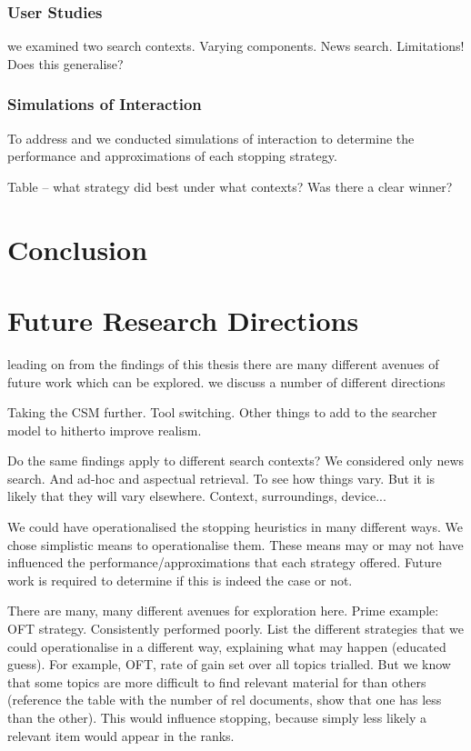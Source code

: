 \subsubsection{User Studies}
we examined two search contexts. Varying components. News search. Limitations! Does this generalise?

\subsubsection{Simulations of Interaction}
To address  and  we conducted simulations of interaction to determine the performance and approximations of each stopping strategy. 

Table -- what strategy did best under what contexts?
Was there a clear winner?




\section{Conclusion}

\section{Future Research Directions}
leading on from the findings of this thesis there are many different avenues of future work which can be explored.
we discuss a number of different directions 

Taking the CSM further. Tool switching. Other things to add to the searcher model to hitherto improve realism.

Do the same findings apply to different search contexts? We considered only news search. And ad-hoc and aspectual retrieval. To see how things vary. But it is likely that they will vary elsewhere. Context, surroundings, device...


We could have operationalised the stopping heuristics in many different ways. We chose simplistic means to operationalise them. These means may or may not have influenced the performance/approximations that each strategy offered. Future work is required to determine if this is indeed the case or not.

There are many, many different avenues for exploration here. Prime example: OFT strategy. Consistently performed poorly. List the different strategies that we could operationalise in a different way, explaining what may happen (educated guess).
For example, OFT, rate of gain set over all topics trialled. But we know that some topics are more difficult to find relevant material for than others (reference the table with the number of rel documents, show that one has less than the other). This would influence stopping, because simply less likely a relevant item would appear in the ranks.

